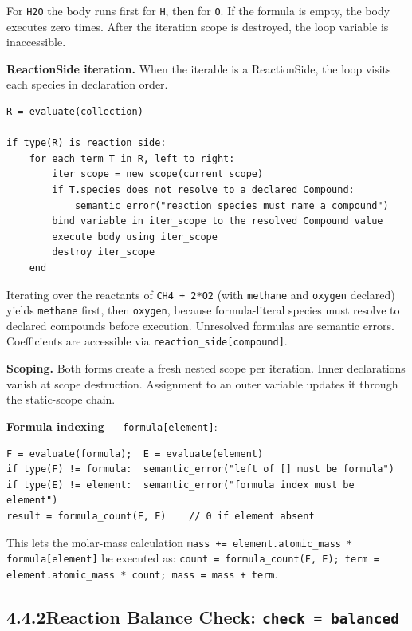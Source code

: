 \documentclass[11pt,a4paper]{article}
\newcommand{\code}[1]{\texttt{#1}}
\begin{document}
For \code{H2O} the body runs first for \code{H}, then for \code{O}. If the formula is empty, the body executes zero times. After the iteration scope is destroyed, the loop variable is inaccessible.

\textbf{ReactionSide iteration.}\; When the iterable is a ReactionSide, the loop visits each species in declaration order.

\begin{lstlisting}[style=sem]
R = evaluate(collection)

if type(R) is reaction_side:
    for each term T in R, left to right:
        iter_scope = new_scope(current_scope)
        if T.species does not resolve to a declared Compound:
            semantic_error("reaction species must name a compound")
        bind variable in iter_scope to the resolved Compound value
        execute body using iter_scope
        destroy iter_scope
    end
\end{lstlisting}

Iterating over the reactants of \code{CH4 + 2*O2} (with \code{methane} and \code{oxygen} declared) yields \code{methane} first, then \code{oxygen}, because formula-literal species must resolve to declared compounds before execution. Unresolved formulas are semantic errors. Coefficients are accessible via \code{reaction\_side[compound]}.

\textbf{Scoping.}\; Both forms create a fresh nested scope per iteration. Inner declarations vanish at scope destruction. Assignment to an outer variable updates it through the static-scope chain.

\textbf{Formula indexing} --- \code{formula[element]}:

\begin{lstlisting}[style=sem]
F = evaluate(formula);  E = evaluate(element)
if type(F) != formula:  semantic_error("left of [] must be formula")
if type(E) != element:  semantic_error("formula index must be element")
result = formula_count(F, E)    // 0 if element absent
\end{lstlisting}

This lets the molar-mass calculation \code{mass += element.atomic\_mass * formula[element]} be executed as: \texttt{count = formula\_count(F, E);\ term = element.atomic\_mass * count;\ mass = mass + term}.

\subsection{4.4.2\quad Reaction Balance Check: \code{check = balanced}}
\end{document}
